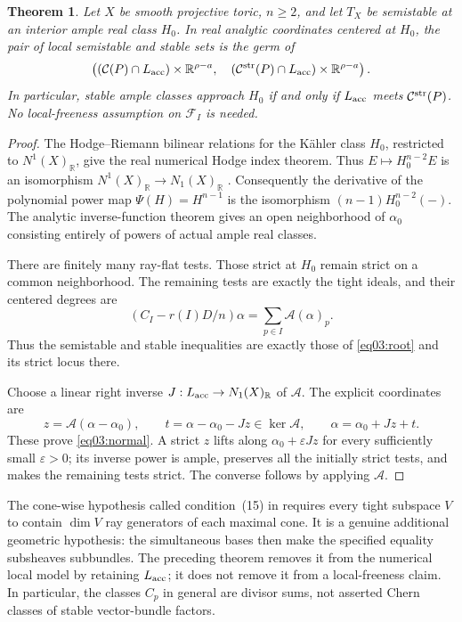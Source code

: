 \documentclass[11pt]{amsart}
\newtheorem{theorem}{Theorem}[section]
\theoremstyle{definition}
\theoremstyle{remark}
\newcommand{\RR}{\mathbb R}
\newcommand{\cC}{\mathcal C}
\begin{document}
\begin{theorem}\label{thm03:normal}
Let \(X\) be smooth projective toric, \(n\ge2\), and let \(T_X\)
be semistable at an interior ample real class \(H_0\). In real
analytic coordinates centered at \(H_0\), the pair of local
semistable and stable sets is the germ of
\begin{equation}\label{eq03:normal}
 \left(
  (\cC(P)\cap L_{\rm acc})\times\RR^{\rho-a},\quad
  (\cC^{\rm str}(P)\cap L_{\rm acc})\times\RR^{\rho-a}
 \right).
\end{equation}
In particular, stable ample classes approach \(H_0\) if and only if
\(L_{\rm acc}\) meets \(\cC^{\rm str}(P)\). No local-freeness
assumption on \(\mathcal F_I\) is needed.
\end{theorem}

\begin{proof}
The Hodge--Riemann bilinear relations for the Kähler class \(H_0\),
restricted to \(N^1(X)_\RR\), give the real numerical Hodge index
theorem. Thus
\(E\mapsto H_0^{n-2}E\) is an isomorphism
\(N^1(X)_\RR\to N_1(X)_\RR\)
\cite[Theorem~6.4 and Corollary~6.5]{grebrosstoma2016}.
Consequently the derivative of the polynomial power map
\(\Psi(H)=H^{n-1}\) is the isomorphism
\((n-1)H_0^{n-2}(-)\). The analytic inverse-function theorem gives
an open neighborhood of \(\alpha_0\) consisting entirely of powers
of actual ample real classes.

There are finitely many ray-flat tests. Those strict at \(H_0\)
remain strict on a common neighborhood. The remaining tests are
exactly the tight ideals, and their centered degrees are
\[
 (C_I-r(I)D/n)\alpha=\sum_{p\in I}\mathcal A(\alpha)_p.
\]
Thus the semistable and stable inequalities are exactly those of
\eqref{eq03:root} and its strict locus there.

Choose a linear right inverse \(J:L_{\rm acc}\to N_1(X)_\RR\)
of \(\mathcal A\). The explicit coordinates are
\begin{equation}\label{eq03:coordinates}
 z=\mathcal A(\alpha-\alpha_0),\qquad
 t=\alpha-\alpha_0-Jz\in\ker\mathcal A,
 \qquad\alpha=\alpha_0+Jz+t.
\end{equation}
These prove \eqref{eq03:normal}. A strict \(z\) lifts along
\(\alpha_0+\varepsilon Jz\) for every sufficiently small
\(\varepsilon>0\); its inverse power is ample, preserves all the
initially strict tests, and makes the remaining tests strict.
The converse follows by applying \(\mathcal A\).
\end{proof}

The cone-wise hypothesis called condition~(15) in
\cite{wuebben2026toricchambers} requires every tight subspace \(V\)
to contain \(\dim V\) ray generators of each maximal cone. It is
a genuine additional geometric hypothesis: the simultaneous bases
then make the specified equality subsheaves subbundles. The preceding
theorem removes it from the numerical local model by retaining
\(L_{\rm acc}\); it does not remove it from a local-freeness claim.
In particular, the classes \(C_p\) in general are divisor sums,
not asserted Chern classes of stable vector-bundle factors.
\end{document}

